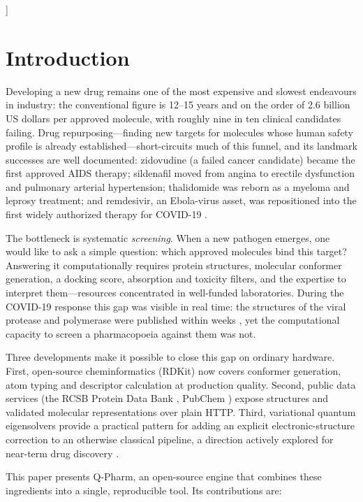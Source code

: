 \documentclass[10pt,a4paper,twocolumn]{article}
\begin{document}
]

\section{Introduction}

Developing a new drug remains one of the most expensive and slowest endeavours in
industry: the conventional figure is 12--15 years and on the order of 2.6 billion US
dollars per approved molecule, with roughly nine in ten clinical candidates failing.
Drug repurposing---finding new targets for molecules whose human safety profile is
already established---short-circuits much of this funnel, and its landmark successes are
well documented: zidovudine (a failed cancer candidate) became the first approved AIDS
therapy; sildenafil moved from angina to erectile dysfunction and pulmonary arterial
hypertension; thalidomide was reborn as a myeloma and leprosy treatment; and remdesivir,
an Ebola-virus asset, was repositioned into the first widely authorized therapy for
COVID-19 \cite{pushpakom2019,beigel2020}.

The bottleneck is systematic \emph{screening}. When a new pathogen emerges, one would
like to ask a simple question: which approved molecules bind this target? Answering it
computationally requires protein structures, molecular conformer generation, a docking
score, absorption and toxicity filters, and the expertise to interpret them---resources
concentrated in well-funded laboratories. During the COVID-19 response this gap was
visible in real time: the structures of the viral protease and polymerase were published
within weeks \cite{jin2020,yin2020}, yet the computational capacity to screen a
pharmacopoeia against them was not.

Three developments make it possible to close this gap on ordinary hardware. First,
open-source cheminformatics (RDKit) now covers conformer generation, atom typing and
descriptor calculation at production quality. Second, public data services (the RCSB
Protein Data Bank \cite{berman2000}, PubChem \cite{kim2023}) expose structures and
validated molecular representations over plain HTTP. Third, variational quantum
eigensolvers \cite{peruzzo2014,kandala2017} provide a practical pattern for adding an
explicit electronic-structure correction to an otherwise classical pipeline, a direction
actively explored for near-term drug discovery \cite{cao2019,li2024}.

This paper presents Q-Pharm, an open-source engine that combines these ingredients into
a single, reproducible tool. Its contributions are:
\end{document}
